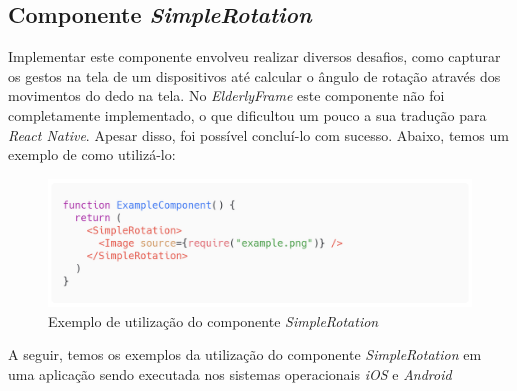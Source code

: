 \documentclass[
	12pt,				    %
	openright,			    %
	oneside,			    %
	a4paper,			    %
    sumario=tradicional,    %
	english,			    %
	brazil,				    %
	]{abntex2}              %
\begin{document}
\subsection{Componente \textit{SimpleRotation}}

Implementar este componente envolveu realizar diversos desafios, como capturar os gestos na tela de um dispositivos até calcular o ângulo de rotação através dos movimentos do dedo na tela. No \textit{ElderlyFrame} este componente não foi completamente implementado, o que dificultou um pouco a sua tradução para \textit{React Native}. Apesar disso, foi possível concluí-lo com sucesso. Abaixo, temos um exemplo de como utilizá-lo:

\begin{figure}[H]
	\begin{center}
		\includegraphics[width=.8\linewidth]{images/SimpleRotation.png}
		\caption[Componente \textit{SimpleRotation}]{Exemplo de utilização do componente \textit{SimpleRotation}}
		\label{fig:simpleRotationExample}
	\end{center}
\end{figure}

\par

A seguir, temos os exemplos da utilização do componente \textit{SimpleRotation} em uma aplicação sendo executada nos sistemas operacionais \textit{iOS} e \textit{Android}
\end{document}
